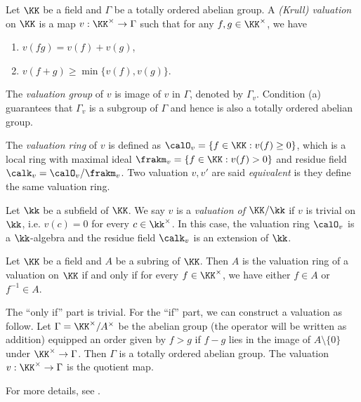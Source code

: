 \begin{definition}
	Let $\KK$ be a field and $\Gamma$ be a totally ordered abelian group.
	A \emph{(Krull) valuation} on $\KK$ is a map $v: \KK^\times \to \Gamma$ such that for any $f, g \in \KK^\times$, we have
	\begin{enumerate}
		\item $v(fg) = v(f) + v(g)$,
		\item $v(f + g) \geq \min\{v(f), v(g)\}$.
	\end{enumerate}

	The \emph{valuation group} of $v$ is image of $v$ in $\Gamma$, denoted by $\Gamma_v$.
	Condition (a) guarantees that $\Gamma_v$ is a subgroup of $\Gamma$ and hence is also a totally ordered abelian group.

	The \emph{valuation ring} of $v$ is defined as $\calO_v = \{ f \in \KK : v(f) \geq 0 \}$, which is a local ring with maximal ideal $\frakm_v = \{ f \in \KK : v(f) > 0 \}$ and residue field $\calk_v = \calO_v / \frakm_v$.
	Two valuation $v,v'$ are said \emph{equivalent} is they define the same valuation ring.

	Let $\kk$ be a subfield of $\KK$.
	We say $v$ is a \emph{valuation of $\KK/\kk$} if $v$ is trivial on $\kk$, i.e. $v(c) = 0$ for every $c \in \kk^\times$.
	In this case, the valuation ring $\calO_v$ is a $\kk$-algebra and the residue field $\calk_v$ is an extension of $\kk$.
\end{definition}

\begin{remark}
	Let $\KK$ be a field and $A$ be a subring of $\KK$.
	Then $A$ is the valuation ring of a valuation on $\KK$ if and only if for every $f \in \KK^\times$, we have either $f \in A$ or $f^{-1} \in A$.

	The ``only if'' part is trivial.
	For the ``if'' part, we can construct a valuation as follow.
	Let $\Gamma = \KK^\times / A^\times$ be the abelian group (the operator will be written as addition)
	equipped an order given by $f>g$ if $f-g$ lies in the image of $A\setminus\{0\}$ under $\KK^\times \to \Gamma$.
	Then $\Gamma$ is a totally ordered abelian group.
	The valuation $v:\KK^\times \to \Gamma$ is the quotient map.

	For more details, see \cite[\href{https://stacks.math.columbia.edu/tag/00I8}{Tag 00I8}]{Stacks}.
\end{remark}

